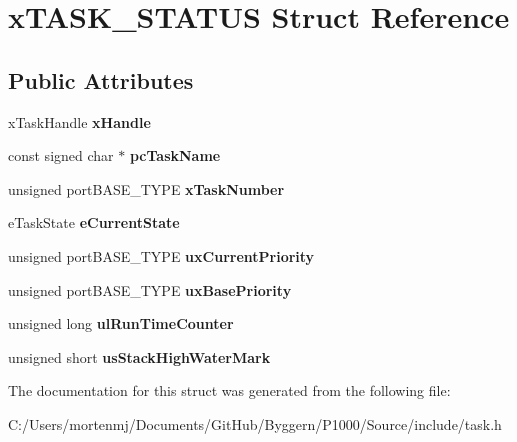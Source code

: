 \hypertarget{structx_t_a_s_k___s_t_a_t_u_s}{\section{x\-T\-A\-S\-K\-\_\-\-S\-T\-A\-T\-U\-S Struct Reference}
\label{structx_t_a_s_k___s_t_a_t_u_s}
}
\subsection*{Public Attributes}
\begin{DoxyCompactItemize}
\item 
\hypertarget{structx_t_a_s_k___s_t_a_t_u_s_a16b862ad7f2460c2575d14350b5e7270}{x\-Task\-Handle {\bfseries x\-Handle}}\label{structx_t_a_s_k___s_t_a_t_u_s_a16b862ad7f2460c2575d14350b5e7270}

\item 
\hypertarget{structx_t_a_s_k___s_t_a_t_u_s_a0b00a968685528cecb83b8d7f22b7863}{const signed char $\ast$ {\bfseries pc\-Task\-Name}}\label{structx_t_a_s_k___s_t_a_t_u_s_a0b00a968685528cecb83b8d7f22b7863}

\item 
\hypertarget{structx_t_a_s_k___s_t_a_t_u_s_a14a06c8bd78b7f60f9395593ac06b286}{unsigned port\-B\-A\-S\-E\-\_\-\-T\-Y\-P\-E {\bfseries x\-Task\-Number}}\label{structx_t_a_s_k___s_t_a_t_u_s_a14a06c8bd78b7f60f9395593ac06b286}

\item 
\hypertarget{structx_t_a_s_k___s_t_a_t_u_s_a727e904e3afe49472b0fc6a4e96439cb}{e\-Task\-State {\bfseries e\-Current\-State}}\label{structx_t_a_s_k___s_t_a_t_u_s_a727e904e3afe49472b0fc6a4e96439cb}

\item 
\hypertarget{structx_t_a_s_k___s_t_a_t_u_s_a381d967bd2222b5cb98efa708ae8a4d3}{unsigned port\-B\-A\-S\-E\-\_\-\-T\-Y\-P\-E {\bfseries ux\-Current\-Priority}}\label{structx_t_a_s_k___s_t_a_t_u_s_a381d967bd2222b5cb98efa708ae8a4d3}

\item 
\hypertarget{structx_t_a_s_k___s_t_a_t_u_s_a8bc6dc2f8978353bd749865e0df234bc}{unsigned port\-B\-A\-S\-E\-\_\-\-T\-Y\-P\-E {\bfseries ux\-Base\-Priority}}\label{structx_t_a_s_k___s_t_a_t_u_s_a8bc6dc2f8978353bd749865e0df234bc}

\item 
\hypertarget{structx_t_a_s_k___s_t_a_t_u_s_a494d5201034e99551b51c94be3cfe34e}{unsigned long {\bfseries ul\-Run\-Time\-Counter}}\label{structx_t_a_s_k___s_t_a_t_u_s_a494d5201034e99551b51c94be3cfe34e}

\item 
\hypertarget{structx_t_a_s_k___s_t_a_t_u_s_a1563de12a37cce2c0cca1b7bdea81848}{unsigned short {\bfseries us\-Stack\-High\-Water\-Mark}}\label{structx_t_a_s_k___s_t_a_t_u_s_a1563de12a37cce2c0cca1b7bdea81848}

\end{DoxyCompactItemize}


The documentation for this struct was generated from the following file\-:\begin{DoxyCompactItemize}
\item 
C\-:/\-Users/mortenmj/\-Documents/\-Git\-Hub/\-Byggern/\-P1000/\-Source/include/task.\-h\end{DoxyCompactItemize}
